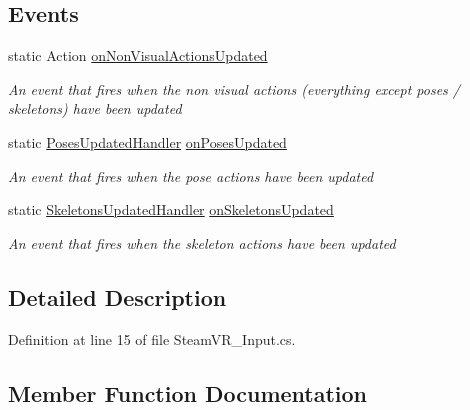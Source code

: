 \subsection*{Events}
\begin{DoxyCompactItemize}
\item 
static Action \mbox{\hyperlink{class_valve_1_1_v_r_1_1_steam_v_r___input_a41fa3f6c1ba5a5464ce99167780db227}{on\+Non\+Visual\+Actions\+Updated}}
\begin{DoxyCompactList}\small\item\em An event that fires when the non visual actions (everything except poses / skeletons) have been updated \end{DoxyCompactList}\item 
static \mbox{\hyperlink{class_valve_1_1_v_r_1_1_steam_v_r___input_acfd43d7f2d9763ec0aff8e11dfdcf15d}{Poses\+Updated\+Handler}} \mbox{\hyperlink{class_valve_1_1_v_r_1_1_steam_v_r___input_a930229f4a6d398c4c911f45063592e28}{on\+Poses\+Updated}}
\begin{DoxyCompactList}\small\item\em An event that fires when the pose actions have been updated \end{DoxyCompactList}\item 
static \mbox{\hyperlink{class_valve_1_1_v_r_1_1_steam_v_r___input_a1880748ba2acc071a2a1e6eaa2ca2fd5}{Skeletons\+Updated\+Handler}} \mbox{\hyperlink{class_valve_1_1_v_r_1_1_steam_v_r___input_aca21226a9a9cd62d3039f0b378606a39}{on\+Skeletons\+Updated}}
\begin{DoxyCompactList}\small\item\em An event that fires when the skeleton actions have been updated \end{DoxyCompactList}\end{DoxyCompactItemize}


\subsection{Detailed Description}


Definition at line 15 of file Steam\+V\+R\+\_\+\+Input.\+cs.



\subsection{Member Function Documentation}
\mbox{\label{class_valve_1_1_v_r_1_1_steam_v_r___input_a8926553c62a1d68cdd22f78cbe03a2e2}} 
